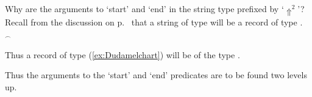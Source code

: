 Why are the arguments to `start' and `end' in the string type prefixed
by `$\Uparrow^2$'?  Recall from the discussion on
p.~\pageref{pg:stringsasrecords} that a string of type  will
be a record of type .  
\begin{ex} 
\begin{subex} 
 
\item  {}$^{\frown}$
 
\item
 
\end{subex} 
 

   
\end{ex} 
Thus a record of type (\ref{ex:Dudamelchart}) will be of the type
\nexteg{}.
\begin{ex} 
\end{ex} 
Thus the arguments to the `start' and `end' predicates are to be found
two levels up.  

